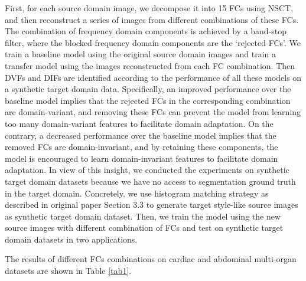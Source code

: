 \documentclass[letterpaper]{article} %
\begin{document}
First, for each source domain image, we decompose it into 15 FCs using NSCT, and then reconstruct a series of images from different 
combinations of these FCs. The combination of frequency domain components is achieved by a band-stop filter, where the blocked frequency domain 
components are the `rejected FCs'. We train a baseline model 
using the original source domain images and train a transfer model using the images reconstructed from each FC combination. Then DVFs 
and DIFs are identified according to the performance of all these models on a synthetic target domain data. Specifically, an improved 
performance over the baseline model implies that the rejected FCs in the corresponding combination are domain-variant, and removing 
these FCs can prevent the model from learning too many domain-variant features to facilitate domain adaptation. On the contrary, a 
decreased performance over the baseline model implies that the removed FCs are domain-invariant, and by retaining these components, 
the model is encouraged to learn domain-invariant features to facilitate domain adaptation. In view of this insight, we conducted the 
experiments on synthetic target domain datasets because we have no access to segmentation ground truth in the target domain. Concretely, 
we use histogram matching strategy as described in original paper Section 3.3 to generate target style-like source images as synthetic 
target domain dataset. Then, we train the model using the new source images with different combination of FCs and test on synthetic target 
domain datasets in two applications.


The results of different FCs combinations on cardiac and abdominal multi-organ datasets are shown in Table \ref{tab1}.
\end{document}
